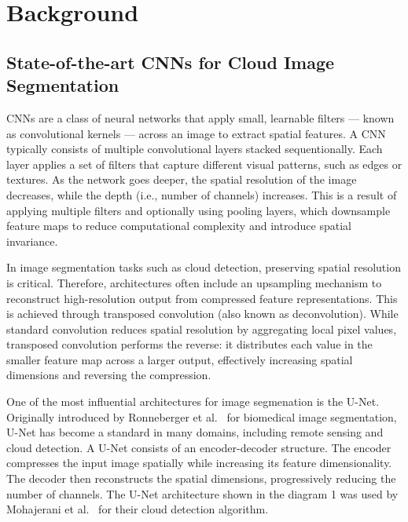 {

\setlength{\parindent}{0pt}
\setlength{\parskip}{1em}

\section{Background}
\subsection{State-of-the-art CNNs for Cloud Image Segmentation}

CNNs are a class of neural networks that apply small, learnable filters --- known as convolutional kernels --– across an image to extract spatial features. A CNN typically consists of multiple convolutional layers stacked sequentionally. Each layer applies a set of filters that capture different visual patterns, such as edges or textures. As the network goes deeper, the spatial resolution of the image decreases, while the depth (i.e., number of channels) increases. This is a result of applying multiple filters and optionally using pooling layers, which downsample feature maps to reduce computational complexity and introduce spatial invariance.

In image segmentation tasks such as cloud detection, preserving spatial resolution is critical. Therefore, architectures often include an upsampling mechanism to reconstruct high-resolution output from compressed feature representations. This is achieved through transposed convolution (also known as deconvolution). While standard convolution reduces spatial resolution by aggregating local pixel values, transposed convolution performs the reverse: it distributes each value in the smaller feature map across a larger output, effectively increasing spatial dimensions and reversing the compression.

One of the most influential architectures for image segmenation is the U-Net. Originally introduced by Ronneberger et al.~\cite{ronneberger2015u} for biomedical image segmentation, U-Net has become a standard in many domains, including remote sensing and cloud detection. A U-Net consists of an encoder-decoder structure. The encoder compresses the input image spatially while increasing its feature dimensionality. The decoder then reconstructs the spatial dimensions, progressively reducing the number of channels. The U-Net architecture shown in the diagram 1 was used by Mohajerani et al.~\cite{mohajerani2019cloudnet}  for their cloud detection algorithm.

}
